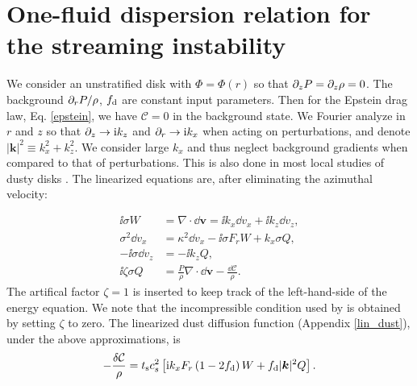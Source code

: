 \section{One-fluid dispersion relation for the streaming instability}\label{compressible_streaming}
We consider an unstratified disk with $\Phi = \Phi (r)$ so that $\partial_zP = \partial_z\rho =
0$. The background $\partial_rP/\rho$, $f_\mathrm{d}$ are constant
input parameters. Then for the Epstein drag law, Eq. \ref{epstein}, we
have $\mathcal{C}=0$ in the background state. 
We Fourier analyze in $r$ and $z$ so that $\partial_z\to \mathrm{i} k_z$ and
$\partial_r\to \mathrm{i} k_x$ when acting on perturbations, and denote $|\bm{k}|^2
\equiv k_x^2 + k_z^2$. We consider large $k_x$ and thus neglect background
gradients when compared to that of perturbations.  
 This is also done in most local studies of
dusty disks \citep[e.g.][]{youdin07b}.  
The linearized
equations are, after eliminating the azimuthal velocity: 

\begin{align}
  \ii \sigma W &=\nabla\cdot \dd \bm{ v} = \ii k_x \dd v_x + \ii k_z \dd v_z,\label{streaming_mass}\\
    \sigma^2 \dd v_x &= \kappa^2 \dd v_x - \ii \sigma F_r W +
    k_x\sigma Q,\label{streaming_vx}\\
  -\ii\sigma\dd v_z &= -\ii k_zQ,\label{streaming_vz}\\
\ii \zeta \sigma  Q & = \frac{P}{\rho} \nabla \cdot \dd\bm{v}   -
  \frac{\dd \mathcal{C}}{\rho}. 
\end{align}
The artifical factor $\zeta = 1$  is inserted to keep track of the
left-hand-side of the energy equation. We note that the incompressible
condition used by \cite{jacquet11} is obtained by setting $\zeta$ to zero. 
The linearized dust diffusion
function (Appendix \ref{lin_dust}), 
under the above approximations, is 
\begin{align}
-\frac{\delta \mathcal{C}}{\rho}  = t_\mathrm{s} c_s^2 \left[\mathrm{i} k_x F_r\left( 1-2f_\mathrm{d}\right)
  W + f_\mathrm{d} |\bm{k}|^2 Q\right]. \label{lin_drag_si}
\end{align}

